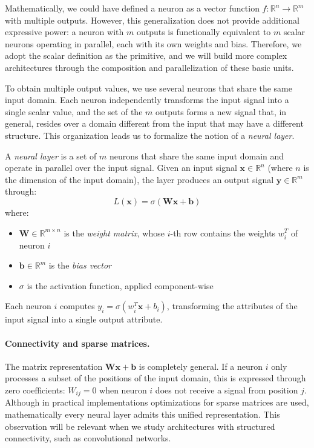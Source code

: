 Mathematically, we could have defined a neuron as a vector function $f: \mathbb{R}^n \to \mathbb{R}^m$ with multiple outputs. However, this generalization does not provide additional expressive power: a neuron with $m$ outputs is functionally equivalent to $m$ scalar neurons operating in parallel, each with its own weights and bias. Therefore, we adopt the scalar definition as the primitive, and we will build more complex architectures through the composition and parallelization of these basic units.

To obtain multiple output values, we use several neurons that share the same input domain. Each neuron independently transforms the input signal into a single scalar value, and the set of the $m$ outputs forms a new signal that, in general, resides over a domain different from the input that may have a different structure. This organization leads us to formalize the notion of a \textit{neural layer}.

\begin{definition}
\label{def:capa_neuronal}
A \textit{neural layer} is a set of $m$ neurons that share the same input domain and operate in parallel over the input signal. Given an input signal $\mathbf{x} \in \mathbb{R}^n$ (where $n$ is the dimension of the input domain), the layer produces an output signal $\mathbf{y} \in \mathbb{R}^m$ through:
\[
L(\mathbf{x}) = \sigma(\mathbf{W}\mathbf{x} + \mathbf{b})
\]
where:
\begin{itemize}
    \item $\mathbf{W} \in \mathbb{R}^{m \times n}$ is the \textit{weight matrix}, whose $i$-th row contains the weights $w_i^T$ of neuron $i$
    \item $\mathbf{b} \in \mathbb{R}^m$ is the \textit{bias vector}
    \item $\sigma$ is the activation function, applied component-wise
\end{itemize}
Each neuron $i$ computes $y_i = \sigma(w_i^T \mathbf{x} + b_i)$, transforming the attributes of the input signal into a single output attribute.
\end{definition}

\paragraph{Connectivity and sparse matrices.}

 The matrix representation $\mathbf{W}\mathbf{x} + \mathbf{b}$ is completely general. If a neuron $i$ only processes a subset of the positions of the input domain, this is expressed through zero coefficients: $W_{ij} = 0$ when neuron $i$ does not receive a signal from position $j$. Although in practical implementations optimizations for sparse matrices are used, mathematically every neural layer admits this unified representation. This observation will be relevant when we study architectures with structured connectivity, such as convolutional networks.


